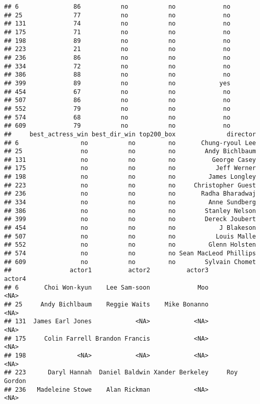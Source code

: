 \documentclass[]{article}
\begin{document}
\begin{verbatim}
## 6               86           no           no             no
## 25              77           no           no             no
## 131             74           no           no             no
## 175             71           no           no             no
## 198             89           no           no             no
## 223             21           no           no             no
## 236             86           no           no             no
## 334             72           no           no             no
## 386             88           no           no             no
## 399             89           no           no            yes
## 454             67           no           no             no
## 507             86           no           no             no
## 552             79           no           no             no
## 574             68           no           no             no
## 609             79           no           no             no
##     best_actress_win best_dir_win top200_box              director
## 6                 no           no         no       Chung-ryoul Lee
## 25                no           no         no        Andy Bichlbaum
## 131               no           no         no          George Casey
## 175               no           no         no           Jeff Werner
## 198               no           no         no         James Longley
## 223               no           no         no     Christopher Guest
## 236               no           no         no       Radha Bharadwaj
## 334               no           no         no         Anne Sundberg
## 386               no           no         no        Stanley Nelson
## 399               no           no         no        Dereck Joubert
## 454               no           no         no            J Blakeson
## 507               no           no         no           Louis Malle
## 552               no           no         no         Glenn Holsten
## 574               no           no         no Sean MacLeod Phillips
## 609               no           no         no        Sylvain Chomet
##                actor1          actor2          actor3         actor4
## 6       Choi Won-kyun    Lee Sam-soon             Moo           <NA>
## 25     Andy Bichlbaum    Reggie Waits    Mike Bonanno           <NA>
## 131  James Earl Jones            <NA>            <NA>           <NA>
## 175     Colin Farrell Brandon Francis            <NA>           <NA>
## 198              <NA>            <NA>            <NA>           <NA>
## 223      Daryl Hannah  Daniel Baldwin Xander Berkeley     Roy Gordon
## 236   Madeleine Stowe    Alan Rickman            <NA>           <NA>

\end{verbatim}
\end{document}
